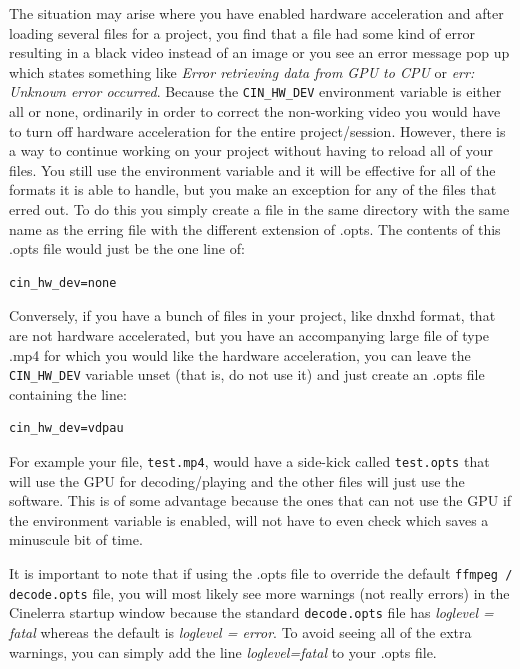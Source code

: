 The situation may arise where you have enabled hardware acceleration and after loading several files for a project, you find that a file had some kind of error resulting in a black video instead of an image or you see an error message pop up which states something like \textit{Error retrieving data from GPU to CPU} or \textit{err: Unknown error occurred}. Because the \texttt{CIN\_HW\_DEV} environment variable is either all or none, ordinarily in order to correct the non-working video you would have to turn off hardware acceleration for the entire project/session.  However, there is a way to continue working on your project without having to reload all of your files. You still use the environment variable and it will be effective for all of the formats it is able to handle, but you make an exception for any of the files that erred out. To do this you simply create a file in the same directory with the same name as the erring file with the different extension of .opts. The contents of this .opts file would just be the one line of:

\begin{lstlisting}[numbers=none]
cin_hw_dev=none
\end{lstlisting}
Conversely, if you have a bunch of files in your project, like dnxhd format, that are not hardware accelerated, but you have an accompanying large file of type .mp4 for which you would like the hardware acceleration, you can leave the \texttt{CIN\_HW\_DEV} variable unset (that is, do not use it) and just create an .opts file containing the line:


\begin{lstlisting}[numbers=none]
cin_hw_dev=vdpau
\end{lstlisting}

For example your file, \texttt{test.mp4}, would have a side-kick called \texttt{test.opts} that will use the GPU for decoding/playing and the other files will just use the software. This is of some advantage because the ones that can not use the GPU if the environment variable is enabled, will not have to even check which saves a minuscule bit of time.

It is important to note that if using the .opts file to override the default \texttt{ffmpeg / decode.opts} file, you will most likely see more warnings (not really errors) in the Cinelerra startup window because the standard \texttt{decode.opts} file has \textit{loglevel = fatal} whereas the default is \textit{loglevel = error}.  To avoid seeing all of the extra warnings, you can simply add the line   \textit{loglevel=fatal}   to your .opts file.

